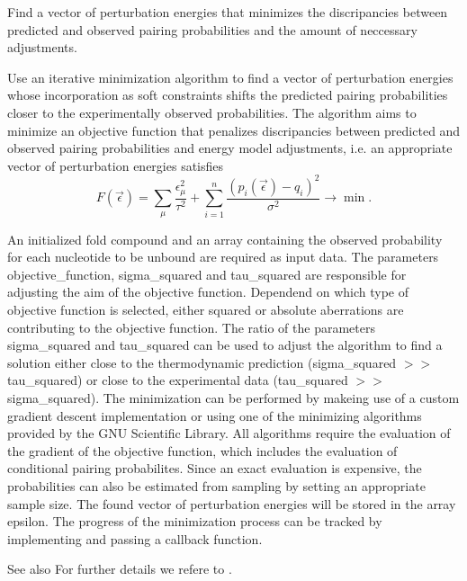 Find a vector of perturbation energies that minimizes the discripancies between predicted and observed pairing probabilities and the amount of neccessary adjustments. 

Use an iterative minimization algorithm to find a vector of perturbation energies whose incorporation as soft constraints shifts the predicted pairing probabilities closer to the experimentally observed probabilities. The algorithm aims to minimize an objective function that penalizes discripancies between predicted and observed pairing probabilities and energy model adjustments, i.\+e. an appropriate vector of perturbation energies satisfies \[ F(\vec\epsilon) = \sum_{\mu}{ \frac{\epsilon_{\mu}^2}{\tau^2} } + \sum_{i = 1}^n{ \frac{(p_i(\vec\epsilon) - q_i)^2}{\sigma^2} } \to \min. \]

An initialized fold compound and an array containing the observed probability for each nucleotide to be unbound are required as input data. The parameters objective\+\_\+function, sigma\+\_\+squared and tau\+\_\+squared are responsible for adjusting the aim of the objective function. Dependend on which type of objective function is selected, either squared or absolute aberrations are contributing to the objective function. The ratio of the parameters sigma\+\_\+squared and tau\+\_\+squared can be used to adjust the algorithm to find a solution either close to the thermodynamic prediction (sigma\+\_\+squared $>$$>$ tau\+\_\+squared) or close to the experimental data (tau\+\_\+squared $>$$>$ sigma\+\_\+squared). The minimization can be performed by makeing use of a custom gradient descent implementation or using one of the minimizing algorithms provided by the G\+NU Scientific Library. All algorithms require the evaluation of the gradient of the objective function, which includes the evaluation of conditional pairing probabilites. Since an exact evaluation is expensive, the probabilities can also be estimated from sampling by setting an appropriate sample size. The found vector of perturbation energies will be stored in the array epsilon. The progress of the minimization process can be tracked by implementing and passing a callback function.

\begin{DoxySeeAlso}{See also}
For further details we refere to \cite{washietl:2012}.
\end{DoxySeeAlso}


